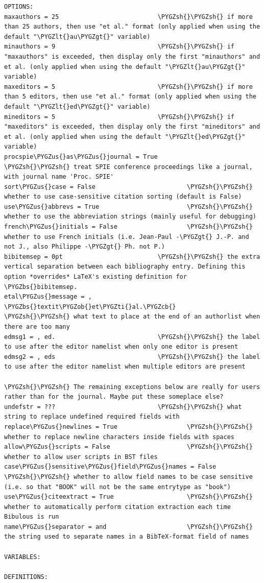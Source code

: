 \documentclass[letterpaper,10pt,english]{sphinxmanual}
\def\PYGZbs{\char`\\}
\def\PYGZus{\char`\_}
\def\PYGZob{\char`\{}
\def\PYGZcb{\char`\}}
\def\PYGZlt{\char`\<}
\def\PYGZgt{\char`\>}
\def\PYGZsh{\char`\#}
\def\PYGZti{\char`\~}
\begin{document}
\begin{Verbatim}[commandchars=\\\{\}]
OPTIONS:
maxauthors = 25                           \PYGZsh{}\PYGZsh{} if more than 25 authors, then use "et al." format (only applied when using the default "\PYGZlt{}au\PYGZgt{}" variable)
minauthors = 9                            \PYGZsh{}\PYGZsh{} if "maxauthors" is exceeded, then display only the first "minauthors" and et al. (only applied when using the default "\PYGZlt{}au\PYGZgt{}" variable)
maxeditors = 5                            \PYGZsh{}\PYGZsh{} if more than 5 editors, then use "et al." format (only applied when using the default "\PYGZlt{}ed\PYGZgt{}" variable)
mineditors = 5                            \PYGZsh{}\PYGZsh{} if "maxeditors" is exceeded, then display only the first "mineditors" and et al. (only applied when using the default "\PYGZlt{}ed\PYGZgt{}" variable)
procspie\PYGZus{}as\PYGZus{}journal = True                \PYGZsh{}\PYGZsh{} treat SPIE conference proceedings like a journal, with journal name 'Proc. SPIE'
sort\PYGZus{}case = False                         \PYGZsh{}\PYGZsh{} whether to use case-sensitive citation sorting (default is False)
use\PYGZus{}abbrevs = True                        \PYGZsh{}\PYGZsh{} whether to use the abbreviation strings (mainly useful for debugging)
french\PYGZus{}initials = False                   \PYGZsh{}\PYGZsh{} whether to use French initials (i.e. Jean-Paul -\PYGZgt{} J.-P. and not J., also Philippe -\PYGZgt{} Ph. not P.)
bibitemsep = 0pt                          \PYGZsh{}\PYGZsh{} the extra vertical separation between each bibliography entry. Defining this option *overrides* LaTeX's existing definition for \PYGZbs{}bibitemsep.
etal\PYGZus{}message = , \PYGZbs{}textit\PYGZob{}et\PYGZti{}al.\PYGZcb{}          \PYGZsh{}\PYGZsh{} what text to place at the end of an authorlist when there are too many
edmsg1 = , ed.                            \PYGZsh{}\PYGZsh{} the label to use after the editor namelist when only one editor is present
edmsg2 = , eds                            \PYGZsh{}\PYGZsh{} the label to use after the editor namelist when multiple editors are present

\PYGZsh{}\PYGZsh{} The remaining exceptions below are really for users rather than for the journal. Maybe put these someplace else?
undefstr = ???                            \PYGZsh{}\PYGZsh{} what string to replace undefined required fields with
replace\PYGZus{}newlines = True                   \PYGZsh{}\PYGZsh{} whether to replace newline characters inside fields with spaces
allow\PYGZus{}scripts = False                     \PYGZsh{}\PYGZsh{} whether to allow user scripts in BST files
case\PYGZus{}sensitive\PYGZus{}field\PYGZus{}names = False        \PYGZsh{}\PYGZsh{} whether to allow field names to be case sensitive (i.e. so that "BOOK" will not be the same entrytype as "book")
use\PYGZus{}citeextract = True                    \PYGZsh{}\PYGZsh{} whether to automatically perform citation extraction each time Bibulous is run
name\PYGZus{}separator = and                      \PYGZsh{}\PYGZsh{} the string used to separate names in a BibTeX-format field of names

VARIABLES:

DEFINITIONS:
\end{Verbatim}
\end{document}
